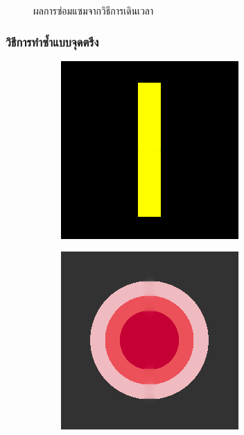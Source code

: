 \documentclass[xcolor=dvipsnames, xetex,serif]{beamer}
\numberwithin{equation}{section}
\begin{document}
\begin{frame}
\begin{figure}[H]
\begin{subfigure}{0.3\linewidth}
				\end{subfigure}
				\caption{ผลการซ่อมแซมจากวิธีการเดินเวลา}
			\end{figure}
		\end{frame}
		\begin{frame}
			\frametitle{วิธีการทำซ้ำแบบจุดตรึง}
			\begin{figure}[H]
				\centering
				\begin{subfigure}{0.3\linewidth}
					\centering
					\includegraphics[width=0.7\linewidth]{images/result_ex1/fixpoint01.png}
				\end{subfigure}
				\begin{subfigure}{0.3\linewidth}
					\centering
					\includegraphics[width=0.7\linewidth]{images/result_ex1/fixpoint02.png}
				\end{subfigure}
				\vspace{1cm}

\end{figure}
\end{frame}
\end{document}
